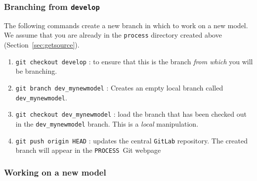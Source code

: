 \documentclass[11pt,a4paper]{report}
\newcommand{\process}{\mbox{\texttt{PROCESS}}}
\begin{document}
\subsubsection{Branching from \texttt{develop}}

The following commands create a new branch in which to work on a new model. We
assume that you are already in the \texttt{process} directory created above
(Section~\ref{sec:getsource}).
\begin{enumerate}

\item \texttt{git checkout develop} : to ensure that this is the branch
      \textit{from which}\/ you will be branching.

\item \texttt{git branch dev\_mynewmodel} : Creates an empty local branch called \texttt{dev\_mynewmodel}.

\item \texttt{git checkout dev\_mynewmodel} : load the branch that has been checked out in
      the \texttt{dev\_mynewmodel} branch. This is a \textit{local} manipulation.

\item \texttt{git push origin HEAD} : updates the central \texttt{GitLab} repository. The
      created branch will appear in the \process\ Git webpage 

\end{enumerate}

\subsubsection{Working on a new model}
\end{document}
